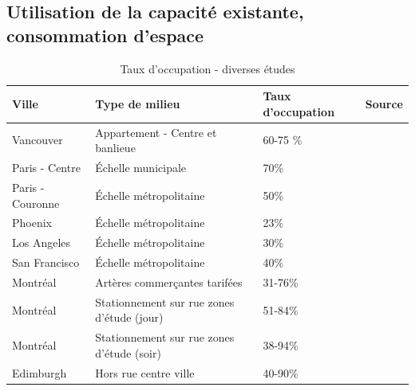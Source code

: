     \subsection{Utilisation de la capacité existante, consommation d'espace}
        \begin{table}[t]
            \caption{Taux d'occupation - diverses études}
            \label{tab:taux-occupation}
            \centering
            \begin{tabular}{lp{3cm}p{2cm}p{5cm}}
                \hline
                Ville & Type de milieu & Taux d'occupation & Source \\
                \hline
                Vancouver & Appartement - Centre et banlieue & 60-75 \% & \parencite{translink_2018_2019}  \\
                Paris - Centre & Échelle municipale  & 70\% &\parencite{heran_consommation_2008}\\
                Paris - Couronne & Échelle métropolitaine & 50\% & \parencite{heran_consommation_2008}\\
                Phoenix & Échelle métropolitaine & 23\% & \parencite{hoehne_valley_2019}\\
                Los Angeles & Échelle métropolitaine & 30\% & \parencite{chester_parking_2015,hoehne_valley_2019} \\
                San Francisco & Échelle métropolitaine & 40\% & \parencite{chester_inventorying_2022}\\
                Montréal & Artères commerçantes tarifées & 31-76\% & \parencite[p. 116]{aignel_elaboration_2015}\\
                Montréal & Stationnement sur rue zones d'étude (jour) & 51-84\% & \parencite[p. 127]{aignel_elaboration_2015}\\
                Montréal & Stationnement sur rue zones d'étude (soir) & 38-94\% & \parencite[p. 127]{aignel_elaboration_2015}\\
                Edimburgh & Hors rue centre ville & 40-90\% & \parencite{rye_role_2008}\\
                \hline
            \end{tabular}
            
        \end{table}
